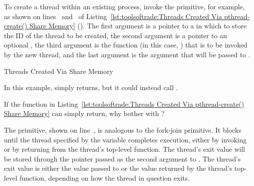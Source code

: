 \begin{lineref}
To create a thread within an existing process, invoke the
 primitive, for example, as shown on
lines~ and~ of
Listing~\ref{lst:toolsoftrade:Threads Created Via pthread-create() Share Memory}
().
The first argument is a pointer to a  in which to store the
ID of the thread to be created, the second  argument is a pointer
to an optional , the third argument is the function
(in this case, )
that is to be invoked by the new thread, and the last  argument
is the argument that will be passed to .
\end{lineref}

\begin{listing}[tbp]

\caption{Threads Created Via  Share Memory}
\label{lst:toolsoftrade:Threads Created Via pthread-create() Share Memory}
\end{listing}

In this example,  simply returns, but it could instead
call .

\QuickQuiz{}
	If the  function in
	Listing~\ref{lst:toolsoftrade:Threads Created Via pthread-create() Share Memory}
	can simply return, why bother with ?
 \QuickQuizEnd

\begin{lineref}
The  primitive, shown on line~,
is analogous to
the fork-join  primitive.
It blocks until the thread specified by the  variable completes
execution, either by invoking  or by returning from
the thread's top-level function.
The thread's exit value will be stored through the pointer passed as the
second argument to .
The thread's exit value is either the value passed to 
or the value returned by the thread's top-level function, depending on
how the thread in question exits.
\end{lineref}

